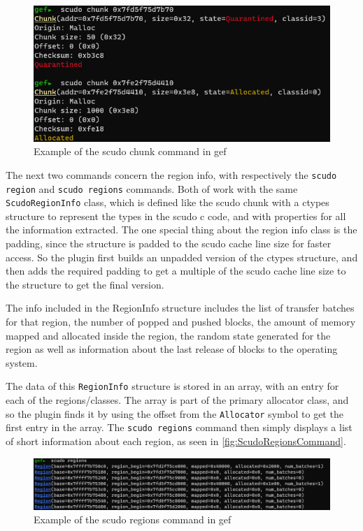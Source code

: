 \documentclass[a4paper,11pt,oneside]{report}
\begin{document}
\begin{figure}[h!]
  \centering
  \includegraphics[width=\linewidth]{figures/ScudoChunkCommand.png}
  \caption{Example of the scudo chunk command in gef}
  \label{fig:ScudoChunkCommand}
\end{figure}

The next two commands concern the region info, with respectively the
\verb|scudo region| and \verb|scudo regions| commands. Both of work with the same
\verb|ScudoRegionInfo| class, which is defined like the scudo chunk with a ctypes
structure to represent the types in the scudo c code, and with properties for
all the information extracted. The one special thing about the region info
class is the padding, since the structure is padded to the scudo cache line
size for faster access. So the plugin first builds an unpadded version of the
ctypes structure, and then adds the required padding to get a multiple of the
scudo cache line size to the structure to get the final version.

The info included in the RegionInfo structure includes the list of transfer
batches for that region, the number of popped and pushed blocks, the amount
of memory mapped and allocated inside the region, the random state generated
for the region as well as information about the last release of blocks to
the operating system.

The data of this \verb|RegionInfo| structure is stored in an array, with an entry
for each of the regions/classes. The array is part of the primary allocator
class, and so the plugin finds it by using the offset from the \verb|Allocator|
symbol to get the first entry in the array.
The \verb|scudo regions| command then simply displays a list of short information
about each region, as seen in \autoref{fig:ScudoRegionsCommand}.

\begin{figure}[h!]
  \centering
  \includegraphics[width=\linewidth]{figures/ScudoRegionsCommand.png}
  \caption{Example of the scudo regions command in gef}
  \label{fig:ScudoRegionsCommand}
\end{figure}
\end{document}
